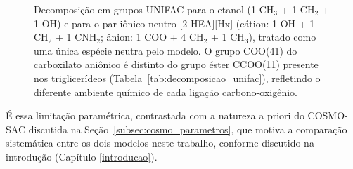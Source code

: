 \begin{figure}[H]
{%
    }
    
    \caption{Decomposição em grupos UNIFAC para o etanol
    (1 CH$_3$ + 1 CH$_2$ + 1 OH) e para o par iônico neutro [2-HEA][Hx]
    (cátion: 1 OH + 1 CH$_2$ + 1 CNH$_2$; ânion: 1 COO + 4 CH$_2$ + 1 CH$_3$),
    tratado como uma única espécie neutra pelo modelo. O grupo COO(41)
    do carboxilato aniônico é distinto do grupo éster CCOO(11) presente
    nos triglicerídeos (Tabela~\ref{tab:decomposicao_unifac}), refletindo
    o diferente ambiente químico de cada ligação carbono-oxigênio.}
    \label{fig:unifac_decomposition}
\end{figure}

É essa limitação paramétrica, contrastada com a natureza a priori do COSMO-SAC discutida na Seção~\ref{subsec:cosmo_parametros}, que motiva a comparação sistemática entre os dois modelos neste trabalho, conforme discutido na introdução (Capítulo \ref{introducao}).

